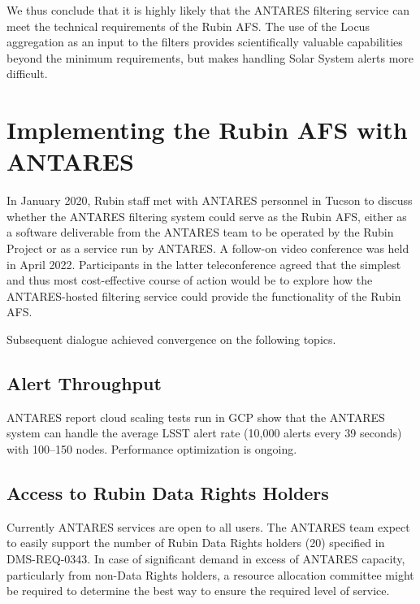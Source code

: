\documentclass[DM,authoryear,toc]{lsstdoc}
\begin{document}
We thus conclude that it is highly likely that the ANTARES filtering service can meet the technical requirements of the Rubin AFS.
The use of the Locus aggregation as an input to the filters provides scientifically valuable capabilities beyond the minimum requirements, but makes handling Solar System alerts more difficult.



\section{Implementing the Rubin AFS with ANTARES} \label{sec:implementation}

In January 2020, Rubin staff 
met with ANTARES personnel %
in Tucson to discuss whether the ANTARES filtering system could serve as the Rubin AFS, either as a software deliverable from the ANTARES team to be operated by the Rubin Project or as a service run by ANTARES.
A follow-on video conference was held in April 2022.
Participants in the latter teleconference agreed that the simplest and thus most cost-effective course of action would be to explore how the ANTARES-hosted filtering service could provide the functionality of the Rubin AFS.

Subsequent dialogue achieved convergence on the following topics.

\subsection{Alert Throughput}

ANTARES report cloud scaling tests run in GCP show that the ANTARES system can handle the average LSST alert rate (10,000 alerts every 39 seconds) with 100--150 nodes.
Performance optimization is ongoing.

\subsection{Access to Rubin Data Rights Holders}

Currently ANTARES services are open to all users.  
The ANTARES team expect to easily support the number of Rubin Data Rights holders (20) specified in DMS-REQ-0343.
In case of significant demand in excess of ANTARES capacity, particularly from non-Data Rights holders, a resource allocation committee might be required to determine the best way to ensure the required level of service.
\end{document}
